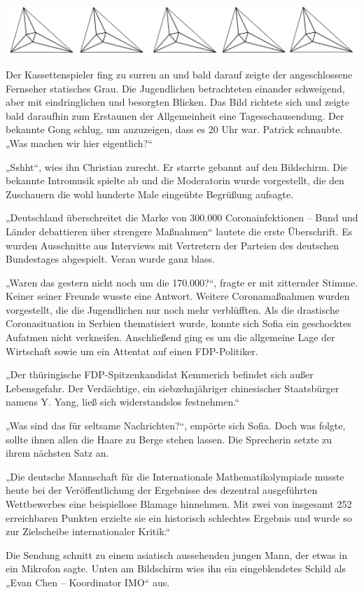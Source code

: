 \documentclass[oneside]{memoir}
\newcommand{\parasep}{
\bigskip
\bigskip
\begin{center} 
   \includegraphics[scale=.08]{parasep5.jpg} 
\end{center}
\bigskip
\bigskip
}
\begin{document}
\parasep

Der Kassettenspieler fing zu surren an und bald darauf zeigte der angeschlossene Fernseher statisches Grau. Die Jugendlichen betrachteten einander schweigend, aber mit eindringlichen und besorgten Blicken. Das Bild richtete sich und zeigte bald daraufhin zum Erstaunen der Allgemeinheit eine Tagesschausendung. Der bekannte Gong schlug, um anzuzeigen, dass es 20 Uhr war. Patrick schnaubte.
„Was machen wir hier eigentlich?“

„Sshht“, wies ihn Christian zurecht. Er starrte gebannt auf den Bildschirm. Die bekannte Intromusik spielte ab und die Moderatorin wurde vorgestellt, die den Zuschauern die wohl hunderte Male eingeübte Begrüßung aufsagte.

„Deutschland überschreitet die Marke von 300.000 Coronainfektionen – Bund und Länder debattieren über strengere Maßnahmen“ lautete die erste Überschrift. Es wurden Ausschnitte aus Interviews mit Vertretern der Parteien des deutschen Bundestages abgespielt. Veran wurde ganz blass.

„Waren das gestern nicht noch um die 170.000?“, fragte er mit zitternder Stimme. Keiner seiner Freunde wusste eine Antwort. Weitere Coronamaßnahmen wurden vorgestellt, die die Jugendlichen nur noch mehr verblüfften. Als die drastische Coronasituation in Serbien thematisiert wurde, konnte sich Sofia ein geschocktes Aufatmen nicht verkneifen. Anschließend ging es um die allgemeine Lage der Wirtschaft sowie um ein Attentat auf einen FDP-Politiker.

„Der thüringische FDP-Spitzenkandidat Kemmerich befindet sich außer Lebensgefahr. Der Verdächtige, ein siebzehnjähriger chinesischer Staatsbürger namens Y. Yang, ließ sich widerstandslos festnehmen.“

„Was sind das für seltsame Nachrichten?“, empörte sich Sofia. Doch was folgte, sollte ihnen allen die Haare zu Berge stehen lassen. Die Sprecherin setzte zu ihrem nächsten Satz an.

„Die deutsche Mannschaft für die Internationale Mathematikolympiade musste heute bei der Veröffentlichung der Ergebnisse des dezentral ausgeführten Wettbewerbes eine beispiellose Blamage hinnehmen. Mit zwei von insgesamt 252 erreichbaren Punkten erzielte sie ein historisch schlechtes Ergebnis und wurde so zur Zielscheibe internationaler Kritik.“

Die Sendung schnitt zu einem asiatisch aussehenden jungen Mann, der etwas in ein Mikrofon sagte. Unten am Bildschirm wies ihn ein eingeblendetes Schild als „Evan Chen – Koordinator IMO“ aus.
\end{document}
